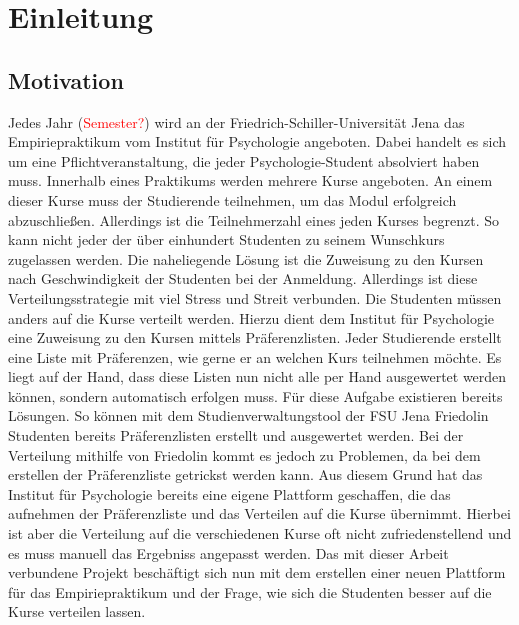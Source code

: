 \chapter{Einleitung}
\label{chapter:introduction}

    \section{Motivation}
    \label{sec:motivation}
        Jedes Jahr (\textcolor{red}{Semester?}) wird an der Friedrich-Schiller-Universität Jena das Empiriepraktikum vom Institut für Psychologie angeboten.
        Dabei handelt es sich um eine Pflichtveranstaltung, die jeder Psychologie-Student absolviert haben muss.
        Innerhalb eines Praktikums werden mehrere Kurse angeboten.
        An einem dieser Kurse muss der Studierende teilnehmen, um das Modul erfolgreich abzuschließen.
        Allerdings ist die Teilnehmerzahl eines jeden Kurses begrenzt.
        So kann nicht jeder der über einhundert Studenten zu seinem Wunschkurs zugelassen werden.
        Die naheliegende Lösung ist die Zuweisung zu den Kursen nach Geschwindigkeit der Studenten bei der Anmeldung.
        Allerdings ist diese Verteilungsstrategie mit viel Stress und Streit verbunden.
        Die Studenten müssen anders auf die Kurse verteilt werden.
        Hierzu dient dem Institut für Psychologie eine Zuweisung zu den Kursen mittels Präferenzlisten.
        Jeder Studierende erstellt eine Liste mit Präferenzen, wie gerne er an welchen Kurs teilnehmen möchte.
        Es liegt auf der Hand, dass diese Listen nun nicht alle per Hand ausgewertet werden können, sondern automatisch erfolgen muss.
        Für diese Aufgabe existieren bereits Lösungen.
        So können mit dem Studienverwaltungstool der FSU Jena Friedolin Studenten bereits Präferenzlisten erstellt und ausgewertet werden.
        Bei der Verteilung mithilfe von Friedolin kommt es jedoch zu Problemen, da bei dem erstellen der Präferenzliste getrickst werden kann.
        Aus diesem Grund hat das Institut für Psychologie bereits eine eigene Plattform geschaffen, die das aufnehmen der Präferenzliste und das Verteilen auf die Kurse übernimmt.
        Hierbei ist aber die Verteilung auf die verschiedenen Kurse oft nicht zufriedenstellend und es muss manuell das Ergebniss angepasst werden.
        Das mit dieser Arbeit verbundene Projekt beschäftigt sich nun mit dem erstellen einer neuen Plattform für das Empiriepraktikum und der Frage, wie sich die Studenten besser auf die Kurse verteilen lassen.
        
